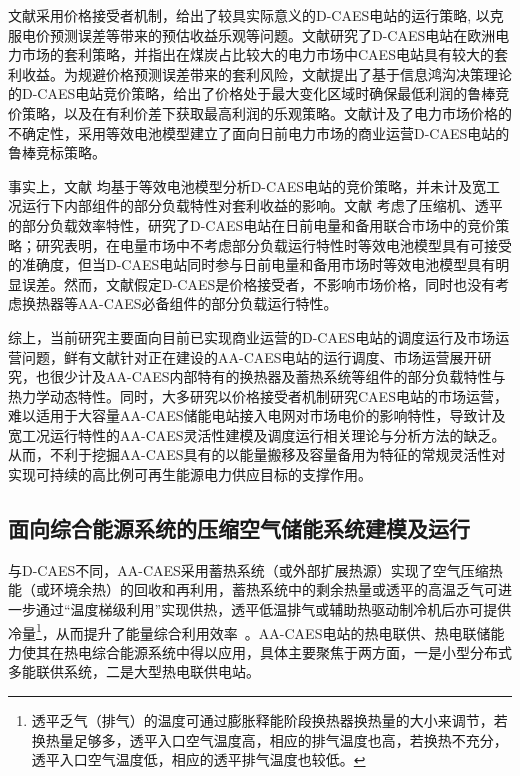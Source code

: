 文献采用价格接受者机制，给出了较具实际意义的D-CAES电站的运行策略, 以克服电价预测误差等带来的预估收益乐观等问题。文献研究了D-CAES电站在欧洲电力市场的套利策略，并指出在煤炭占比较大的电力市场中CAES电站具有较大的套利收益。为规避价格预测误差带来的套利风险，文献提出了基于信息鸿沟决策理论的D-CAES电站竞价策略，给出了价格处于最大变化区域时确保最低利润的鲁棒竞价策略，以及在有利价差下获取最高利润的乐观策略。文献计及了电力市场价格的不确定性，采用等效电池模型建立了面向日前电力市场的商业运营D-CAES电站的鲁棒竞标策略。

事实上，文献 均基于等效电池模型分析D-CAES电站的竞价策略，并未计及宽工况运行下内部组件的部分负载特性对套利收益的影响。文献 考虑了压缩机、透平的部分负载效率特性，研究了D-CAES电站在日前电量和备用联合市场中的竞价策略；研究表明，在电量市场中不考虑部分负载运行特性时等效电池模型具有可接受的准确度，但当D-CAES电站同时参与日前电量和备用市场时等效电池模型具有明显误差\cite{CAES-Reserve-Bid-Therm-16}。然而，文献假定D-CAES是价格接受者，不影响市场价格，同时也没有考虑换热器等AA-CAES必备组件的部分负载运行特性。

综上，当前研究主要面向目前已实现商业运营的D-CAES电站的调度运行及市场运营问题，鲜有文献针对正在建设的AA-CAES电站的运行调度、市场运营展开研究，也很少计及AA-CAES内部特有的换热器及蓄热系统等组件的部分负载特性与热力学动态特性\cite{CAES-Review-18-Rui-operation}。同时，大多研究以价格接受者机制研究CAES电站的市场运营，难以适用于大容量AA-CAES储能电站接入电网对市场电价的影响特性，导致计及宽工况运行特性的AA-CAES灵活性建模及调度运行相关理论与分析方法的缺乏\cite{CAES-Review-18-Rui-operation}。从而，不利于挖掘AA-CAES具有的以能量搬移及容量备用为特征的常规灵活性对实现可持续的高比例可再生能源电力供应目标的支撑作用。

\subsection{面向综合能源系统的压缩空气储能系统建模及运行}
与D-CAES不同，AA-CAES采用蓄热系统（或外部扩展热源）实现了空气压缩热能（或环境余热）的回收和再利用，蓄热系统中的剩余热量或透平的高温乏气可进一步通过“温度梯级利用”实现供热，透平低温排气或辅助热驱动制冷机后亦可提供冷量\footnote{透平乏气（排气）的温度可通过膨胀释能阶段换热器换热量的大小来调节，若换热量足够多，透平入口空气温度高，相应的排气温度也高，若换热不充分，透平入口空气温度低，相应的透平排气温度也较低。}，从而提升了能量综合利用效率~\cite{Trigen-mCAES-15,CAES-Alberta-14,TES-Eff-CAES-13}。AA-CAES电站的热电联供、热电联储能力使其在热电综合能源系统中得以应用，具体主要聚焦于两方面，一是小型分布式多能联供系统，二是大型热电联供电站\cite{CAES-Review-18-Rui-operation}。

